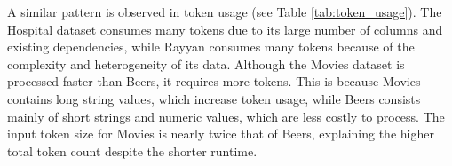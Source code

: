 \begin{table}[h]
\centering
{}
\caption{Runtime (s) for MADClean and baselines across datasets.}
\label{tab:runtimes}
\end{table}

A similar pattern is observed in token usage (see Table \ref{tab:token_usage}). 
The Hospital dataset consumes many tokens due to its large number of columns and existing dependencies, while Rayyan consumes many tokens because of the complexity and heterogeneity of its data. 
Although the Movies dataset is processed faster than Beers, it requires more tokens. 
This is because Movies contains long string values, which increase token usage, while Beers consists mainly of short strings and numeric values, which are less costly to process. 
The input token size for Movies is nearly twice that of Beers, explaining the higher total token count despite the shorter runtime.

\begin{table}[h]
\centering
{}
\caption{Token usage of MADClean across datasets.}
\label{tab:token_usage}
\end{table}


